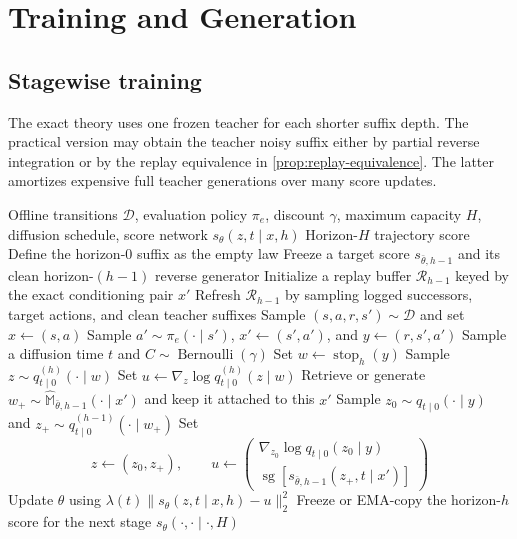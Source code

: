 \documentclass[11pt]{article}
\theoremstyle{definition}
\theoremstyle{remark}
\newcommand{\stoptraj}{\operatorname{stop}}
\newcommand{\sg}{\operatorname{sg}}
\newcommand{\score}{s}
\newcommand{\Teacher}{\bar\theta}
\newcommand{\targetpi}{\pi_e}
\begin{document}
\section{Training and Generation}
\label{sec:algorithm}

\subsection{Stagewise training}

The exact theory uses one frozen teacher for each shorter suffix depth. The
practical version may obtain the teacher noisy suffix either by partial reverse
integration or by the replay equivalence in \cref{prop:replay-equivalence}.
The latter amortizes expensive full teacher generations over many score
updates.

\begin{algorithm}[H]
\caption{Bellman Path Diffusion Training with Suffix Replay}
\label{alg:training}
\begin{algorithmic}[1]
\Require Offline transitions $\mathcal D$, evaluation policy $\targetpi$,
discount $\gamma$, maximum capacity $H$, diffusion schedule, score network
$\score_\theta(z,t\mid x,h)$
\Ensure Horizon-$H$ trajectory score
\State Define the horizon-$0$ suffix as the empty law
    \State Freeze a target score $\score_{\Teacher,h-1}$ and its clean
    horizon-$(h-1)$ reverse generator
    \State Initialize a replay buffer $\mathcal R_{h-1}$ keyed by the exact
    conditioning pair $x'$
    \State Refresh $\mathcal R_{h-1}$ by sampling logged successors,
    target actions, and clean teacher suffixes
    \Repeat
        \State Sample $(s,a,r,s')\sim\mathcal D$ and set $x\gets(s,a)$
        \State Sample $a'\sim\targetpi(\cdot\mid s')$,
        $x'\gets(s',a')$, and $y\gets(r,s',a')$
        \State Sample a diffusion time $t$ and
        $C\sim\operatorname{Bernoulli}(\gamma)$
            \State Set $w\gets\stoptraj_h(y)$
            \State Sample $z\sim q_{t\mid0}^{(h)}(\cdot\mid w)$
            \State Set
            $u\gets\nabla_z\log q_{t\mid0}^{(h)}(z\mid w)$
        \Else
            \State Retrieve or generate
            $w_+\sim
            \widehat{\mathbb M}_{\Teacher,h-1}(\cdot\mid x')$
            and keep it attached to this $x'$
            \State Sample
            $z_0\sim q_{t\mid0}(\cdot\mid y)$ and
            $z_+\sim q_{t\mid0}^{(h-1)}(\cdot\mid w_+)$
            \State Set
            \[
            z\gets(z_0,z_+),
            \qquad
            u\gets
            \begin{pmatrix}
            \nabla_{z_0}\log q_{t\mid0}(z_0\mid y)
            \\
            \sg[\score_{\Teacher,h-1}(z_+,t\mid x')]
            \end{pmatrix}
            \]
        \EndIf
        \State Update $\theta$ using
        $\lambda(t)\|\score_\theta(z,t\mid x,h)-u\|_2^2$
    \State Freeze or EMA-copy the horizon-$h$ score for the next stage
\EndFor
\State \Return $\score_\theta(\cdot,\cdot\mid\cdot,H)$
\end{algorithmic}
\end{algorithm}
\end{document}
